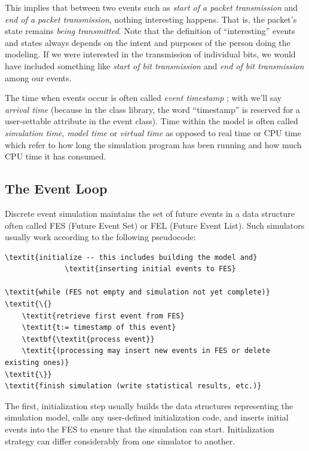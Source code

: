 This implies that between two events such as \textit{start of a packet
transmission} and \textit{end of a packet transmission}, nothing
interesting happens. That is, the packet's state remains \textit{being
transmitted}. Note that the definition of ``interesting'' events and states always
depends on the intent and purposes of the person doing the modeling.
If we were interested in the transmission of individual bits, we would
have included something like \textit{start of bit transmission} and
\textit{end of bit transmission} among our events.


The time when events occur is often called \textit{event timestamp}
; with {\opp} we'll say
\textit{arrival time} (because in the class
library, the word ``timestamp'' is reserved for a user-settable
attribute in the event class). Time within the model is often called
\textit{simulation time}, \textit{model time}
 or \textit{virtual time}
as opposed to real time or CPU time
which refer to how long the simulation program has been running and
how much CPU time it has consumed.



\subsection{The Event Loop}
\label{sec:simple-modules:event-loop}

Discrete event simulation maintains the set of future
events in a data structure often called
FES (Future Event Set) or FEL (Future Event List).
Such simulators usually work according to the following pseudocode:

\begin{Verbatim}[commandchars=\\\{\}]
\textit{initialize -- this includes building the model and}
              \textit{inserting initial events to FES}

\textit{while (FES not empty and simulation not yet complete)}
\textit{\{}
    \textit{retrieve first event from FES}
    \textit{t:= timestamp of this event}
    \textbf{\textit{process event}}
    \textit{(processing may insert new events in FES or delete existing ones)}
\textit{\}}
\textit{finish simulation (write statistical results, etc.)}
\end{Verbatim}


The first, initialization step usually builds the data structures
representing the simulation model, calls any user-defined
initialization code, and inserts initial events
into the FES to ensure that the simulation can start. Initialization
strategy can differ considerably from one simulator to another.


